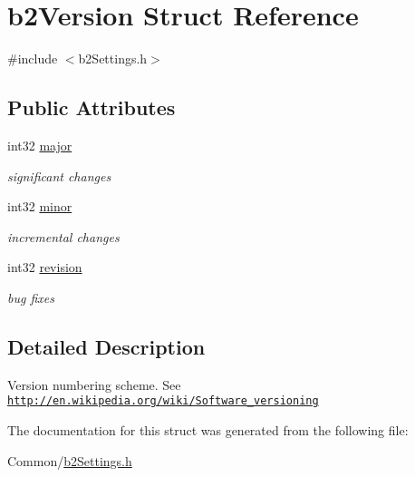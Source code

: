 \hypertarget{structb2Version}{}\section{b2\+Version Struct Reference}
\label{structb2Version}


{\ttfamily \#include $<$b2\+Settings.\+h$>$}

\subsection*{Public Attributes}
\begin{DoxyCompactItemize}
\item 
\mbox{\label{structb2Version_a720da8e346364d1cb34d176125380b44}} 
int32 \mbox{\hyperlink{structb2Version_a720da8e346364d1cb34d176125380b44}{major}}
\begin{DoxyCompactList}\small\item\em significant changes \end{DoxyCompactList}\item 
\mbox{\label{structb2Version_a115b8797a6e0b8e53f54502bd20d89da}} 
int32 \mbox{\hyperlink{structb2Version_a115b8797a6e0b8e53f54502bd20d89da}{minor}}
\begin{DoxyCompactList}\small\item\em incremental changes \end{DoxyCompactList}\item 
\mbox{\label{structb2Version_a395cfe1434e348115d2ead3d72b88847}} 
int32 \mbox{\hyperlink{structb2Version_a395cfe1434e348115d2ead3d72b88847}{revision}}
\begin{DoxyCompactList}\small\item\em bug fixes \end{DoxyCompactList}\end{DoxyCompactItemize}


\subsection{Detailed Description}
Version numbering scheme. See \href{http://en.wikipedia.org/wiki/Software_versioning}{\tt http\+://en.\+wikipedia.\+org/wiki/\+Software\+\_\+versioning} 

The documentation for this struct was generated from the following file\+:\begin{DoxyCompactItemize}
\item 
Common/\mbox{\hyperlink{b2Settings_8h}{b2\+Settings.\+h}}\end{DoxyCompactItemize}
